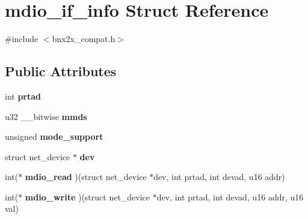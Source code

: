\hypertarget{structmdio__if__info}{
\section{mdio\_\-if\_\-info Struct Reference}
\label{structmdio__if__info}
}


{\ttfamily \#include $<$bnx2x\_\-compat.h$>$}

\subsection*{Public Attributes}
\begin{DoxyCompactItemize}
\item 
\hypertarget{structmdio__if__info_aad5c088e4eea422024074d8640115057}{
int {\bfseries prtad}}
\label{structmdio__if__info_aad5c088e4eea422024074d8640115057}

\item 
\hypertarget{structmdio__if__info_ac3874f3f1b4d721a0c17db00c2a2ceac}{
u32 \_\-\_\-bitwise {\bfseries mmds}}
\label{structmdio__if__info_ac3874f3f1b4d721a0c17db00c2a2ceac}

\item 
\hypertarget{structmdio__if__info_a9eef85e0a64bc8b52880d0109a4b79b7}{
unsigned {\bfseries mode\_\-support}}
\label{structmdio__if__info_a9eef85e0a64bc8b52880d0109a4b79b7}

\item 
\hypertarget{structmdio__if__info_a72e8a0147af827739dc9be3dbc924135}{
struct net\_\-device $\ast$ {\bfseries dev}}
\label{structmdio__if__info_a72e8a0147af827739dc9be3dbc924135}

\item 
\hypertarget{structmdio__if__info_a34f72c3cb82c9fcd4bf7fa73284bd4a3}{
int($\ast$ {\bfseries mdio\_\-read} )(struct net\_\-device $\ast$dev, int prtad, int devad, u16 addr)}
\label{structmdio__if__info_a34f72c3cb82c9fcd4bf7fa73284bd4a3}

\item 
\hypertarget{structmdio__if__info_a0c796f534d3f13cb576ad5ed70bd1c0a}{
int($\ast$ {\bfseries mdio\_\-write} )(struct net\_\-device $\ast$dev, int prtad, int devad, u16 addr, u16 val)}
\label{structmdio__if__info_a0c796f534d3f13cb576ad5ed70bd1c0a}

\end{DoxyCompactItemize}


